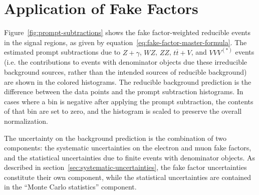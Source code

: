 \section{Application of Fake Factors}\label{sec:fake-factor-application}
Figure~\ref{fig:prompt-subtractions} shows the fake factor-weighted reducible events in the signal regions, as given by equation~\ref{eq:fake-factor-master-formula}. The estimated prompt subtractions due to $Z+\gamma$, $WZ$, $ZZ$, $t\overline{t}+V$, and $VVV^{(*)}$ events (i.e. the contributions to events with denominator objects due these irreducible background sources, rather than the intended sources of reducible background) are shown in the colored histograms. The reducible background prediction is the difference between the data points and the prompt subtraction histograms. In cases where a bin is negative after applying the prompt subtraction, the contents of that bin are set to zero, and the histogram is scaled to preserve the overall normalization. 

The uncertainty on the background prediction is the combination of two components: the systematic uncertainties on the electron and muon fake factors, and the statistical uncertainties due to finite events with denominator objects. As described in section~\ref{sec:systematic-uncertainties}, the fake factor uncertainties constitute their own component, while the statistical uncertainties are contained in the ``Monte Carlo statistics'' component. 

